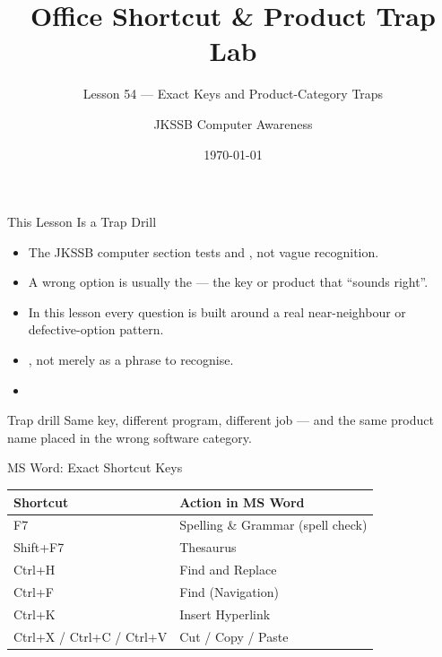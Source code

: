 \documentclass[aspectratio=169]{beamer}
\title{Office Shortcut \& Product Trap Lab}
\subtitle{Lesson 54 --- Exact Keys and Product-Category Traps}
\author{JKSSB Computer Awareness}
\date{\today}
\begin{document}
\frame{\titlepage}

\begin{frame}{This Lesson Is a Trap Drill}
  \begin{itemize}
    \item The JKSSB computer section tests  and
      , not vague recognition.
    \item A wrong option is usually the  --- the key
      or product that ``sounds right''.
    \item In this lesson every question is built around a real near-neighbour
      or defective-option pattern.
    \item {}, not merely as a
      phrase to recognise.
    \item {}
  \end{itemize}
  \begin{alertblock}{Trap drill}
    Same key, different program, different job --- and the same product name
    placed in the wrong software category.
  \end{alertblock}
\end{frame}

\begin{frame}{MS Word: Exact Shortcut Keys}
  \begin{center}
    \begin{tabular}{p{}p{}}
      \toprule
      \textbf{Shortcut} & \textbf{Action in MS Word} \\
      \midrule
      F7 & Spelling \& Grammar (spell check) \\
      Shift+F7 & Thesaurus \\
      Ctrl+H & Find and Replace \\
      Ctrl+F & Find (Navigation) \\
      Ctrl+K & Insert Hyperlink \\
      Ctrl+X / Ctrl+C / Ctrl+V & Cut / Copy / Paste \\
      \bottomrule
    \end{tabular}
  \end{center}
  \vspace{0.25cm}
\end{frame}
\end{document}
